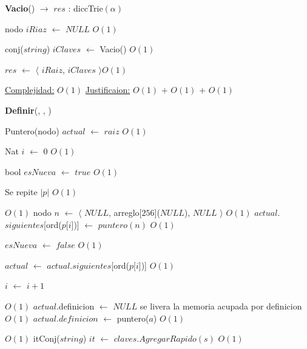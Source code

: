 \begin{Algoritmos}
  
  
\begin{algorithm}[H]
{\textbf{Vacio}() $\to$ $res$ : diccTrie$(\alpha)$}
\begin{algorithmic}[1]

\State nodo $iRiaz$ $\gets $ $NULL$  \Comment $O(1)$
 
\State conj($string$) $iClaves$ $\gets$ Vacio() \Comment $O(1)$

\State $res$ $\gets$  $\langle$ $iRaiz$, $iClaves$ $\rangle$\Comment $O(1)$

\medskip
\State \underline{Complejidad:} $O(1)$
\State \underline{Justificaion:} $O(1)$ $+$ $O(1)$ $+$ $O(1)$

\end{algorithmic}
\end{algorithm}
  

\begin{algorithm}[H]
{\textbf{Definir}(, , )}
\begin{algorithmic}[1]

\State Puntero(nodo) $actual$ $\gets$ $raiz$ \Comment $O(1)$

\State Nat $i$ $\gets$ $0$ \Comment $O(1)$

\State bool $esNueva$ $\gets$ $true$ \Comment $O(1)$

   \Comment Se repite $|p|$ $O(1)$
	
	
	 \Comment $O(1)$
		\State nodo $n$ $\gets$ $\langle$ $NULL$, arreglo[$256$]($NULL$), $NULL$ $\rangle$ \Comment $O(1)$
		\State $actual$.$siguientes$[ord($p$[$i$])] $\gets$	 $puntero(n)$ \Comment $O(1)$
		
		\State $esNueva$ $\gets$ $false$ \Comment $O(1)$	 
	
	\EndIf
	
	\State $actual$ $\gets$ $actual$.$siguientes$[ord($p$[$i$])] \Comment $O(1)$

	\State $i$ $\gets$ $i + 1$
\EndWhile 

 \Comment $O(1)$
	\State $actual$.definicion $\gets$ $NULL$ \Comment se livera la memoria acupada por definicion $O(1)$
\EndIf
\State $actual$.$definicion$ $\gets$ puntero($a$) \Comment $O(1)$

 \Comment $O(1)$
	\State itConj($string$) $it$ $\gets$  $claves.AgregarRapido(s)$ \Comment $O(1)$
	

\end{algorithmic}
\end{algorithm}
\end{Algoritmos}
